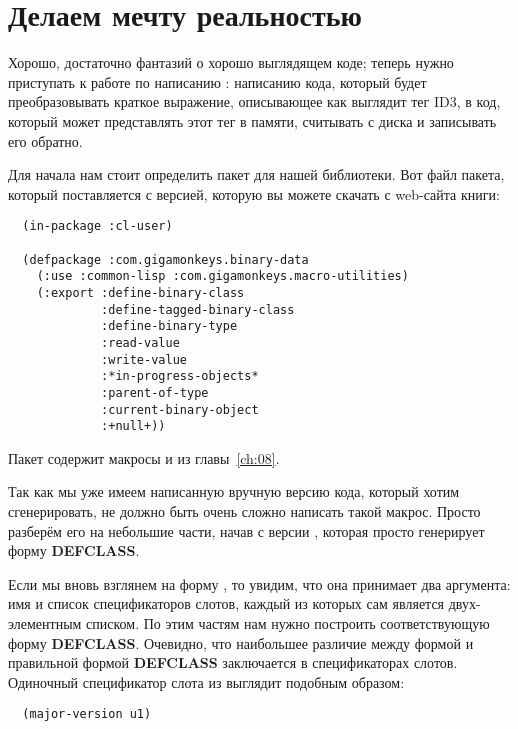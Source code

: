 \section{Делаем мечту реальностью}

Хорошо, достаточно фантазий о хорошо выглядящем коде; теперь нужно приступать к работе по
написанию : написанию кода, который будет преобразовывать
краткое выражение, описывающее как выглядит тег ID3, в код, который может представлять
этот тег в памяти, считывать с диска и записывать его обратно.

Для начала нам стоит определить пакет для нашей библиотеки. Вот файл пакета, который
поставляется с версией, которую вы можете скачать с web-сайта книги:%

\begin{lstlisting}
  (in-package :cl-user)

  (defpackage :com.gigamonkeys.binary-data
    (:use :common-lisp :com.gigamonkeys.macro-utilities)
    (:export :define-binary-class
             :define-tagged-binary-class
             :define-binary-type
             :read-value
             :write-value
             :*in-progress-objects*
             :parent-of-type
             :current-binary-object
             :+null+))
\end{lstlisting}

Пакет  содержит макросы  и
 из главы~\ref{ch:08}.

Так как мы уже имеем написанную вручную версию кода, который хотим сгенерировать, не
должно быть очень сложно написать такой макрос. Просто разберём его на небольшие части,
начав с версии , которая просто генерирует форму
\textbf{DEFCLASS}.

Если мы вновь взглянем на форму , то увидим, что она принимает
два аргумента: имя  и список спецификаторов слотов, каждый из которых сам
является двух-элементным списком. По этим частям нам нужно построить соответствующую форму
\textbf{DEFCLASS}. Очевидно, что наибольшее различие между формой
 и правильной формой \textbf{DEFCLASS} заключается в
спецификаторах слотов. Одиночный спецификатор слота из  выглядит
подобным образом:

\begin{lstlisting}
  (major-version u1)
\end{lstlisting}

